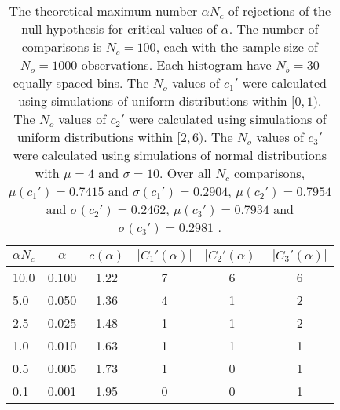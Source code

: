 \begin{table}[h!]
\begin{center}
\begin{tabular}{| l | c | c | c | c | c |}\hline
$\alpha N_c$ & $\alpha$ & $c(\alpha)$ & $|C_1'(\alpha)|$ & $|C_2'(\alpha)|$ & $|C_3'(\alpha)|$ \\\hline
10.0 & 0.100 & 1.22 & 7 & 6 & 6 \\\hline
5.0 & 0.050 & 1.36 & 4 & 1 & 2 \\\hline
2.5 & 0.025 & 1.48 & 1 & 1 & 2 \\\hline
1.0 & 0.010 & 1.63 & 1 & 1 & 1 \\\hline
0.5 & 0.005 & 1.73 & 1 & 0 & 1 \\\hline
0.1 & 0.001 & 1.95 & 0 & 0 & 1 \\\hline
\end{tabular}
\caption{The theoretical maximum number $\alpha N_c$ of rejections
of the null hypothesis for critical values of $\alpha$.
The number of comparisons is $N_c=100$,
each with the sample size of $N_o=1000$ observations.
Each histogram have $N_b=30$ equally spaced bins.
The $N_o$ values of $c_1'$ were calculated using simulations of
 uniform distributions within $[0,1)$.
The $N_o$ values of $c_2'$ were calculated using simulations of
 uniform distributions within $[2,6)$.
The $N_o$ values of $c_3'$ were calculated using simulations of
 normal distributions with $\mu=4$ and $\sigma=10$.
Over all $N_c$ comparisons,
 $\mu(c_1')=0.7415$ and $\sigma(c_1')=0.2904$,
 $\mu(c_2')=0.7954$ and $\sigma(c_2')=0.2462$,
 $\mu(c_3')=0.7934$ and $\sigma(c_3')=0.2981$ .
}
\end{center}
\end{table}